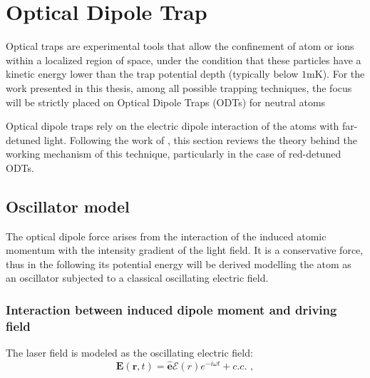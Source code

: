 \section{Optical Dipole Trap}
Optical traps are experimental tools that allow the confinement of atom or ions within a localized region of space, under the condition that these particles have a kinetic energy lower than the trap potential depth (typically below $1$mK). For the work presented in this thesis, among all possible trapping techniques, the focus will be strictly placed on Optical Dipole Traps (ODTs) for neutral atoms

Optical dipole traps rely on the electric dipole interaction of the atoms with far-detuned light. Following the work of \citeauthor*{grimm} \cite{grimm}, this section reviews the theory behind the working mechanism of this technique, particularly in the case of red-detuned ODTs. 

\subsection{Oscillator model}
The optical dipole force arises from the interaction of the induced atomic momentum with the intensity gradient of the light field. It is a conservative force, thus in the following its potential energy will be derived modelling the atom as an oscillator subjected to a classical oscillating electric field.

\subsubsection{Interaction between induced dipole moment and driving field}


The laser field is modeled as the oscillating electric field: 
\begin{equation}
    \mathbf{E}(\mathbf{r},t) = \hat{\mathbf{e}} \mathcal{E}(r) e^{-i\omega t} + c.c. \,\, ,
\end{equation}

